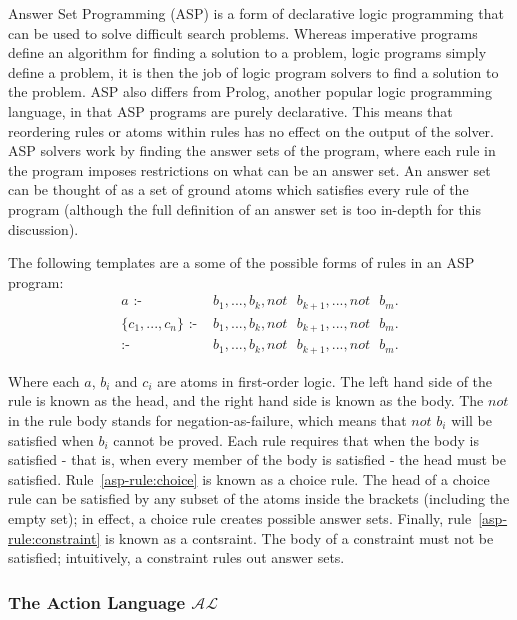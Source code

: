 \documentclass[../interim.tex]{subfiles}
\begin{document}
Answer Set Programming (ASP) is a form of declarative logic programming that can be used to solve difficult search problems. Whereas imperative programs define an algorithm for finding a solution to a problem, logic programs simply define a problem, it is then the job of logic program solvers to find a solution to the problem. ASP also differs from Prolog, another popular logic programming language, in that ASP programs are purely declarative. This means that reordering rules or atoms within rules has no effect on the output of the solver\cite{asp-primer}. ASP solvers work by finding the answer sets of the program, where each rule in the program imposes restrictions on what can be an answer set. An answer set can be thought of as a set of ground atoms which satisfies every rule of the program (although the full definition of an answer set is too in-depth for this discussion).

The following templates are a some of the possible forms of rules in an ASP program:
\begin{align}
  a \text{ :- }& b_1, ..., b_k, not \text{ } b_{k+1}, ..., not \text{ } b_m. \label{asp-rule:normal}\\
  \{c_1,...,c_n\} \text{ :- }& b_1,...,b_k, not \text{ } b_{k+1}, ..., not \text{ } b_m. \label{asp-rule:choice}\\
  \text{:- }& b_1,...,b_k, not \text{ } b_{k+1}, ..., not \text{ } b_m. \label{asp-rule:constraint}
\end{align}

Where each $a$, $b_i$ and $c_i$ are atoms in first-order logic. The left hand side of the rule is known as the head, and the right hand side is known as the body. The $not$ in the rule body stands for negation-as-failure, which means that $not$ $b_i$ will be satisfied when $b_i$ cannot be proved. Each rule requires that when the body is satisfied - that is, when every member of the body is satisfied - the head must be satisfied. Rule~\ref{asp-rule:choice} is known as a choice rule. The head of a choice rule can be satisfied by any subset of the atoms inside the brackets (including the empty set); in effect, a choice rule creates possible answer sets. Finally, rule~\ref{asp-rule:constraint} is known as a contsraint. The body of a constraint must not be satisfied; intuitively, a constraint rules out answer sets.

\subsubsection{The Action Language $\mathcal{AL}$}
\end{document}

